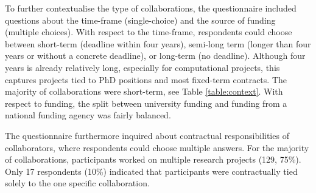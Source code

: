 \documentclass{article}
\begin{document}
\begin{table}
\caption{Descriptive aspects of collaborations, reporting both raw frequencies of answers (\#) and the percentage related to all 173 responses (\%).}\label{table:context}
\end{table}

To further contextualise the type of collaborations, the questionnaire included questions about the time-frame (single-choice) and the source of funding (multiple choices).
With respect to the time-frame, respondents could choose between short-term (deadline within four years), semi-long term (longer than four years or without a concrete deadline), or long-term (no deadline).
Although four years is already relatively long, especially for computational projects, this captures projects tied to PhD positions and most fixed-term contracts.
The majority of collaborations were short-term, see Table \ref{table:context}.
With respect to funding, 
the split between university funding and funding from a national funding agency was fairly balanced.

The questionnaire furthermore 
inquired about
contractual responsibilities of collaborators, where respondents could choose multiple answers. For the majority of collaborations, participants worked on multiple research projects (129, 75\%). Only 17 respondents (10\%) indicated that participants were contractually tied solely to the one specific collaboration. 
\end{document}
